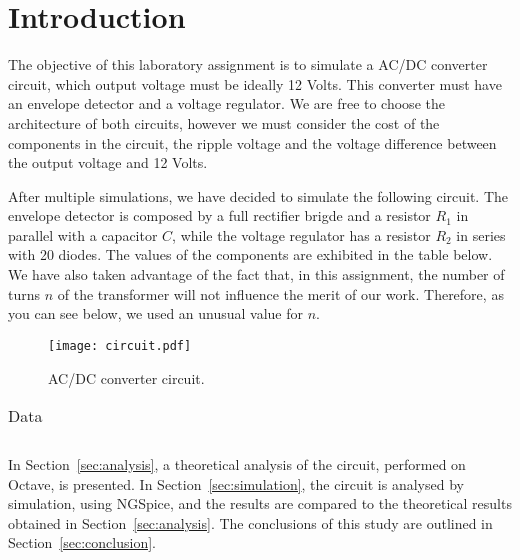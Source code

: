 \section{Introduction}
\label{sec:introduction}
The objective of this laboratory assignment is to simulate a AC/DC converter circuit, which output voltage must be ideally 12 Volts. 
This converter must have an envelope detector and a voltage regulator. We are free to choose the architecture of both circuits, 
however we must consider the cost of the components in the circuit, the ripple voltage and the voltage difference between the output 
voltage and 12 Volts.

After multiple simulations, we have decided to simulate the following circuit. The envelope detector is composed by
a full rectifier brigde and a resistor $R_1$ in parallel with a capacitor $C$, while the voltage regulator has a resistor $R_2$ in
series with 20 diodes. The values of the components are exhibited in the table below. We have also taken advantage of the fact that,
in this assignment, the number of turns $n$ of the transformer will not influence the merit of our work. Therefore, as you can see below,
we used an unusual value for $n$.

\begin{figure}[H] \centering
\texttt{[image: circuit.pdf]}
\caption{AC/DC converter circuit.}                                     
\label{fig:circuit}
\end{figure}

\begin{table}[H]
  \centering
  \begin{tabular}{|l|r|}
    \hline    
    
  \end{tabular}
  \caption{Data}
  \label{tab:data}
\end{table}


In Section~\ref{sec:analysis}, a theoretical analysis of the circuit, 
performed on Octave, is presented. In Section~\ref{sec:simulation}, the 
circuit is analysed by simulation, using NGSpice, and the results are compared to 
the theoretical results obtained in Section~\ref{sec:analysis}. The conclusions 
of this study are outlined in Section~\ref{sec:conclusion}.


